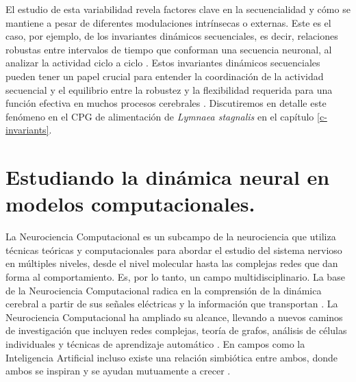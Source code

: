 El estudio de esta variabilidad revela factores clave en la secuencialidad y cómo se mantiene a pesar de diferentes modulaciones intrínsecas o externas. Este es el caso, por ejemplo, de los invariantes dinámicos secuenciales, es decir, relaciones robustas entre intervalos de tiempo que conforman una secuencia neuronal, al analizar la actividad ciclo a ciclo \parencite{reyes_artificial_2008,elices_robust_2019,garrido-pena_characterization_2021,berbel_emergence_2024}. Estos invariantes dinámicos secuenciales pueden tener un papel crucial para entender la coordinación de la actividad secuencial y el equilibrio entre la robustez y la flexibilidad requerida para una función efectiva en muchos procesos cerebrales \parencite{tatsuno_analysis_2015,ullen_neural_2003,zimnik_independent_2021,zhou_neural_2020,dragoi_cell_2020}. Discutiremos en detalle este fenómeno en el CPG de alimentación de \textit{Lymnaea stagnalis} en el capítulo \ref{c-invariants}.\\


\section{Estudiando la dinámica neural en modelos computacionales.}
\label{sec:neurociencia_computacional}
La Neurociencia Computacional es un subcampo de la neurociencia que utiliza técnicas teóricas y computacionales para abordar el estudio del sistema nervioso en múltiples niveles, desde el nivel molecular hasta las complejas redes que dan forma al comportamiento. Es, por lo tanto, un campo multidisciplinario. La base de la Neurociencia Computacional radica en la comprensión de la dinámica cerebral a partir de sus señales eléctricas y la información que transportan \parencite{schwiening_brief_2012,catterall_hodgkin-huxley_2012,dimitrov_information_2011,shannon_mathematical_1948}. La Neurociencia Computacional ha ampliado su alcance, llevando a nuevos caminos de investigación que incluyen redes complejas, teoría de grafos, análisis de células individuales y técnicas de aprendizaje automático \parencite{cns2023}. En campos como la Inteligencia Artificial incluso existe una relación simbiótica entre ambos, donde ambos se inspiran y se ayudan mutuamente a crecer \parencite{amunts_human_2019,wozniak_deep_2020,goncalves_training_2020}.

